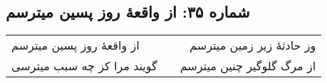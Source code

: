 \begin{center}
\section*{شماره ۳۵: از واقعۀ روز پسین میترسم}
\label{sec:035}
\begin{longtable}{l p{0.5cm} r}
از واقعهٔ روز پسین میترسم
&&
وز حادثهٔ زیر زمین میترسم
\\
گویند مرا کز چه سبب میترسی
&&
از مرگ گلوگیر چنین میترسم
\\
\end{longtable}
\end{center}
